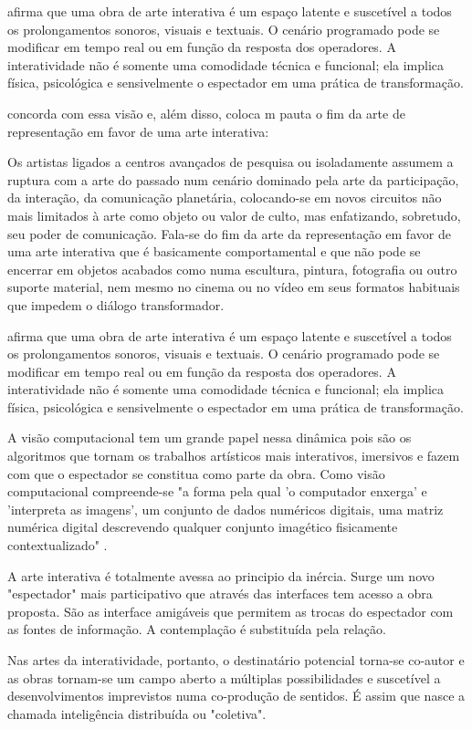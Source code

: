  afirma que uma obra de arte interativa é um espaço latente e suscetível a todos os prolongamentos sonoros, visuais e textuais. O cenário programado pode se modificar em tempo real ou em função da resposta dos operadores. A interatividade não é somente uma comodidade técnica e funcional; ela implica física, psicológica e sensivelmente o espectador em uma prática de transformação.  

 concorda com essa visão e, além disso, coloca m pauta o fim da arte de representação em favor de uma arte interativa:

\begin{citacao}
Os artistas ligados a centros avançados de pesquisa ou isoladamente assumem a ruptura com a arte do passado num cenário dominado pela arte da participação, da interação, da comunicação planetária, colocando-se em novos circuitos não mais limitados à arte como objeto ou valor de culto, mas enfatizando, sobretudo, seu poder de comunicação. Fala-se do fim da arte da representação em favor de uma arte interativa que é basicamente comportamental e que não pode se encerrar em objetos acabados como numa escultura, pintura, fotografia ou outro suporte material, nem mesmo no cinema ou no vídeo em seus formatos habituais que impedem o diálogo transformador. \cite[p.17-18]{domingues}\end{citacao}	

 afirma que uma obra de arte interativa é um espaço latente e suscetível a todos os prolongamentos sonoros, visuais e textuais. O cenário programado pode se modificar em tempo real ou em função da resposta dos operadores. A interatividade não é somente uma comodidade técnica e funcional; ela implica física, psicológica e sensivelmente o espectador em uma prática de transformação.  

A visão computacional tem um grande papel nessa dinâmica pois são os algoritmos que tornam os trabalhos artísticos mais interativos, imersivos e fazem com que o espectador se constitua como parte da obra. Como visão computacional compreende-se "a forma pela qual 'o computador enxerga' e 'interpreta as imagens', um conjunto de dados numéricos digitais, uma matriz numérica digital descrevendo qualquer conjunto imagético fisicamente contextualizado" \cite[p. 134]{caetano}.
				
						
A arte interativa é totalmente avessa ao principio da inércia. Surge um novo "espectador" mais participativo que através das interfaces tem acesso a obra proposta. São as interface amigáveis que permitem as trocas do espectador com as fontes de informação. A contemplação é substituída pela relação. \cite[p.22]{domingues}
							
Nas artes da interatividade, portanto, o destinatário potencial torna-se co-autor e as obras tornam-se um campo aberto a múltiplas possibilidades e suscetível a desenvolvimentos imprevistos numa co-produção de sentidos. É assim que nasce a chamada inteligência distribuída ou "coletiva".  \cite[p. 20]{plaza}			
						



